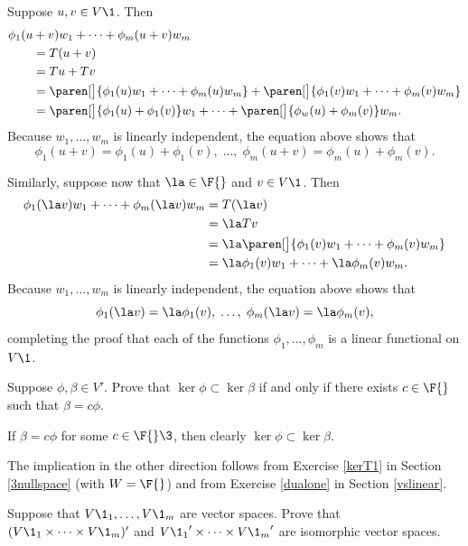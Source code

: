 \begin{Solution}
Suppose $u, v \in V\1$. Then
\begin{align*}
\phi_1(u&+v) w_1 + \cdots + \phi_m(u+v) w_m \\
&= T(u+v) \\
&= Tu + Tv \\
&= \paren[\big]{\phi_1(u) w_1 + \cdots + \phi_m(u) w_m} + \paren[\big]{\phi_1(v) w_1 + \cdots + \phi_m(v) w_m}\\
&= \paren[\big]{ \phi_1(u) + \phi_1(v) } w_1 + \cdots + \paren[\big]{ \phi_w(u) + \phi_m(v) } w_m.
\end{align*}
Because $w_1, \ldots, w_m$ is linearly independent, the equation above shows that
\[
\phi_1(u+v) = \phi_1(u) + \phi_1(v), \; \ldots, \; \phi_m(u+v) = \phi_m(u) + \phi_m(v).
\]

Similarly, suppose now that $\la \in \F{}$ and $v \in V\1$. Then
\begin{align*}
\phi_1(\la v) w_1 + \cdots + \phi_m(\la v) w_m &= T(\la v) \\
&=\la Tv \\
&= \la \paren[\big]{\phi_1(v) w_1 + \cdots + \phi_m(v) w_m}\\
&= \la \phi_1(v) w_1 + \cdots + \la \phi_m(v) w_m.
\end{align*}
Because $w_1, \ldots, w_m$ is linearly independent, the equation above shows that
\[
\phi_1(\la v) = \la \phi_1(v), \; \ldots, \; \phi_m(\la v) = \la \phi_m(v),
\]
completing the proof that each of the functions $\phi_1, \ldots, \phi_m$ is a linear functional on $V\1$.
\end{Solution}

\exercise
Suppose $\phi, \beta \in V'\!$. Prove that $\ker \phi \subset \ker \beta$ if and only if there exists $c \in \F{}$ such that $\beta = c \phi$.\label{7nullsub}

\begin{Solution}
If $\beta = c \phi$ for some $c \in \F{}\3$, then clearly $\ker \phi \subset \ker \beta$.

The implication in the other direction follows from Exercise \ref{kerT1} in Section \ref{3nullspace} (with $W = \F{}$) and from Exercise \ref{dualone} in Section \ref{vslinear}.
\end{Solution}

\exercise
Suppose that $V\1_1, \ldots, V\1_m$ are vector spaces. Prove that $(V\1_1 \times \dots \times V\1_m)'$ and ${V\1_1}' \times \dots \times {V\1_m}'$ are isomorphic vector spaces.

